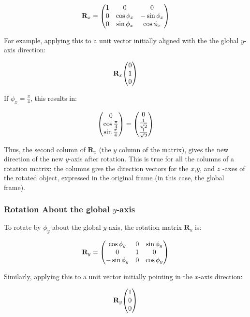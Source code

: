 \documentclass{article}
\begin{document}
\begin{equation}
\mathbf{R}_x = \mqty(
1 & 0 & 0 \\
0 & \cos \phi_x & -\sin \phi_x \\
0 & \sin \phi_x & \cos \phi_x
)
\label{eq:Rx}
\end{equation}

For example, applying this to a unit vector initially aligned with the the global \( y \)-axis direction:

\begin{equation}
\mathbf{R}_x \mqty( 0 \\ 1 \\ 0 )
\end{equation}

If \( \phi_x = \frac{\pi}{4} \), this results in:

\begin{equation}
\mqty( 0 \\ \cos \frac{\pi}{4} \\ \sin \frac{\pi}{4} ) = \mqty( 0 \\ \frac{1}{\sqrt{2}} \\ \frac{1}{\sqrt{2}} )
\end{equation}


Thus, the second column of  \( \mathbf{R}_x \) (the \( y \) column of the matrix), gives the new direction of the new \(y\)-axis after rotation. This is true for all the columns of a rotation matrix: the columns give the direction vectors for the \(x\),\(y\), and \(z\) -axes of the rotated object, expressed in the original frame (in this case, the global frame).

\subsubsection*{Rotation About the global \( y \)-axis}

To rotate by \( \phi_y \) about the global \( y \)-axis, the rotation matrix \( \mathbf{R}_y \) is:

\begin{equation}
\mathbf{R}_y = \mqty(
\cos \phi_y & 0 & \sin \phi_y \\
0 & 1 & 0 \\
-\sin \phi_y & 0 & \cos \phi_y
)
\label{eq:Ry}
\end{equation}

Similarly, applying this to a unit vector initially pointing in the \( x \)-axis direction:

\begin{equation}
\mathbf{R}_y \mqty( 1 \\ 0 \\ 0 )
\end{equation}
\end{document}
